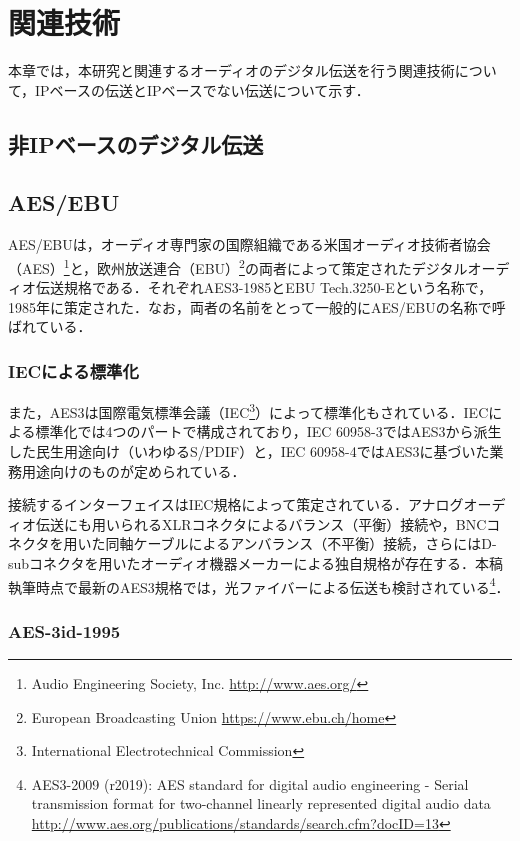 \chapter{関連技術}
\label{chap:related_works}

本章では，本研究と関連するオーディオのデジタル伝送を行う関連技術について，IPベースの伝送とIPベースでない伝送について示す．

\section*{非IPベースのデジタル伝送}

\section{AES/EBU}
\label{sec:aes/ebu}

AES/EBUは，オーディオ専門家の国際組織である米国オーディオ技術者協会（AES）\footnote{Audio Engineering Society, Inc. \url{http://www.aes.org/}}と，欧州放送連合（EBU）\footnote{European Broadcasting Union \url{https://www.ebu.ch/home}}の両者によって策定されたデジタルオーディオ伝送規格である．それぞれAES3-1985\cite{aes3-1985}とEBU Tech.3250-E\cite{ebutech-3250-e}という名称で，1985年に策定された．なお，両者の名前をとって一般的にAES/EBUの名称で呼ばれている．

\subsection{IECによる標準化}

また，AES3は国際電気標準会議（IEC\footnote{International Electrotechnical Commission}）によって標準化もされている．IECによる標準化では4つのパートで構成されており，IEC 60958-3ではAES3から派生した民生用途向け（いわゆるS/PDIF）と，IEC 60958-4ではAES3に基づいた業務用途向けのものが定められている．

接続するインターフェイスはIEC規格によって策定されている．アナログオーディオ伝送にも用いられるXLRコネクタによるバランス（平衡）接続や，BNCコネクタを用いた同軸ケーブルによるアンバランス（不平衡）接続，さらにはD-subコネクタを用いたオーディオ機器メーカーによる独自規格が存在する．本稿執筆時点で最新のAES3規格では，光ファイバーによる伝送も検討されている\footnote{AES3-2009 (r2019): AES standard for digital audio engineering - Serial transmission format for two-channel linearly represented digital audio data \url{http://www.aes.org/publications/standards/search.cfm?docID=13}}．

\subsection{AES-3id-1995}

